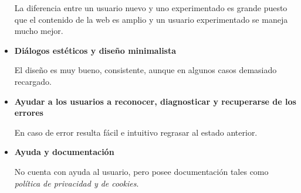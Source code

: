 \documentclass[10pt, spanish, pdftex]{template/UC3M_document}
\begin{document}
\begin{itemize}
  La diferencia entre un usuario nuevo y uno experimentado es grande puesto que el contenido de la web es amplio y un usuario experimentado se maneja mucho mejor.

  \item \textbf{Diálogos estéticos y diseño minimalista}

  El diseño es muy bueno, consistente, aunque en algunos casos demasiado recargado.

  \item \textbf{Ayudar a los usuarios a reconocer, diagnosticar y recuperarse de los errores}

  En caso de error resulta fácil e intuitivo regrasar al estado anterior.

  \item \textbf{Ayuda y documentación}

  No cuenta con ayuda al usuario, pero posee documentación tales como \textit{política de privacidad y de cookies}.
\end{itemize}
\end{document}
